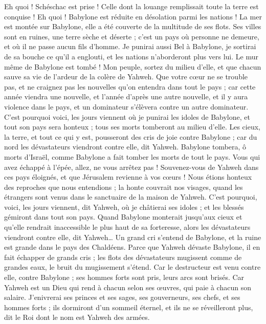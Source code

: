 \begin{multicols}{2}
Eh quoi ! Schéschac est prise ! Celle dont la louange remplissait toute la terre est conquise ! Eh quoi ! Babylone est réduite en désolation parmi les nations !
La mer est montée sur Babylone, elle a été couverte de la multitude de ses flots.
Ses villes sont en ruines, une terre sèche et déserte ; c'est un pays où personne ne demeure, et où il ne passe aucun fils d'homme.
Je punirai aussi Bel à Babylone, je sortirai de sa bouche ce qu'il a englouti, et les nations n'aborderont plus vers lui. Le mur même de Babylone est tombé !
Mon peuple, sortez du milieu d'elle, et que chacun sauve sa vie de l'ardeur de la colère de Yahweh.
Que votre cœur ne se trouble pas, et ne craignez pas les nouvelles qu'on entendra dans tout le pays ; car cette année viendra une nouvelle, et l'année d'après une autre nouvelle, et il y aura violence dans le pays, et un dominateur s'élèvera contre un autre dominateur.
C'est pourquoi voici, les jours viennent où je punirai les idoles de Babylone, et tout son pays sera honteux ; tous ses morts tomberont au milieu d'elle.
Les cieux, la terre, et tout ce qui y est, pousseront des cris de joie contre Babylone ; car du nord les dévastateurs viendront contre elle, dit Yahweh.
Babylone tombera, ô morts d'Israël, comme Babylone a fait tomber les morts de tout le pays.
Vous qui avez échappé à l'épée, allez, ne vous arrêtez pas ! Souvenez-vous de Yahweh dans ces pays éloignés, et que Jérusalem revienne à vos cœurs !
Nous étions honteux des reproches que nous entendions ; la honte couvrait nos visages, quand les étrangers sont venus dans le sanctuaire de la maison de Yahweh.
C'est pourquoi, voici, les jours viennent, dit Yahweh, où je châtierai ses idoles ; et les blessés gémiront dans tout son pays.
Quand Babylone monterait jusqu'aux cieux et qu'elle rendrait inaccessible le plus haut de sa forteresse, alors les dévastateurs viendront contre elle, dit Yahweh…
Un grand cri s'entend de Babylone, et la ruine est grande dans le pays des Chaldéens.
Parce que Yahweh dévaste Babylone, il en fait échapper de grands cris ; les flots des dévastateurs mugissent comme de grandes eaux, le bruit du mugissement s'étend.
Car le destructeur est venu contre elle, contre Babylone ; ses hommes forts sont pris, leurs arcs sont brisés. Car Yahweh est un Dieu qui rend à chacun selon ses œuvres, qui paie à chacun son salaire.
J'enivrerai ses princes et ses sages, ses gouverneurs, ses chefs, et ses hommes forts ; ils dormiront d'un sommeil éternel, et ils ne se réveilleront plus, dit le Roi dont le nom est Yahweh des armées.

\end{multicols}
